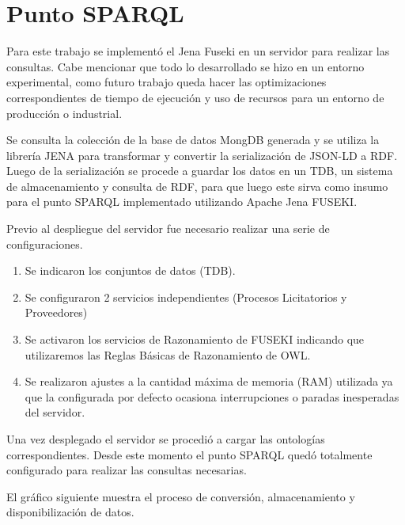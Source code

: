 \section{Punto SPARQL}

Para este trabajo se implementó el Jena Fuseki en un servidor para realizar las consultas. Cabe mencionar que todo lo desarrollado se hizo en un entorno experimental, como futuro trabajo queda hacer las optimizaciones correspondientes de tiempo de ejecución y uso de recursos para un entorno de producción o industrial.

Se consulta la colección de la base de datos MongDB generada y se utiliza la librería JENA para transformar y convertir la serialización de JSON-LD a RDF. Luego de la serialización se procede a guardar los datos en un TDB, un sistema de almacenamiento y consulta de RDF, para que luego este sirva como insumo para el punto SPARQL implementado utilizando Apache Jena FUSEKI.

Previo al despliegue del servidor fue necesario realizar una serie de configuraciones.

\begin{enumerate}
    \item Se indicaron los conjuntos de datos (TDB).
    \item Se configuraron 2 servicios independientes (Procesos Licitatorios y Proveedores)
    \item Se activaron los servicios de Razonamiento de FUSEKI indicando que utilizaremos las Reglas Básicas de Razonamiento de OWL. 
    \item Se realizaron ajustes a la cantidad máxima de memoria (RAM) utilizada ya que la configurada por defecto ocasiona interrupciones o paradas inesperadas del servidor. 

\end{enumerate}

Una vez desplegado el servidor se procedió a cargar las ontologías correspondientes. Desde este momento el punto SPARQL quedó totalmente configurado para realizar las consultas necesarias.

El gráfico siguiente muestra el proceso de conversión, almacenamiento y disponibilización de datos.
